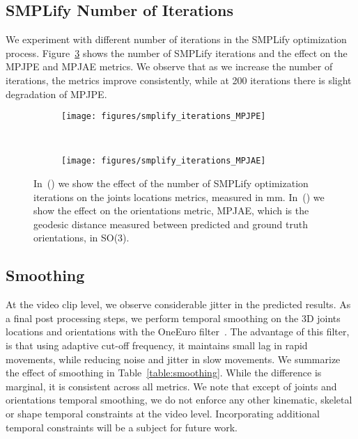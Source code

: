 \documentclass[runningheads]{llncs}
\begin{document}
\subsection{SMPLify Number of Iterations}

We experiment with different number of iterations in the SMPLify optimization process. Figure~\ref{fig:smplify_iters} shows the number of SMPLify iterations and the effect on the MPJPE and MPJAE metrics. We observe that as we increase the number of iterations, the metrics improve consistently, while at 200 iterations there is slight degradation of MPJPE.

\begin{figure}[h!]
	
	\begin{subfigure}[t]{0.5\textwidth}
		\texttt{[image: figures/smplify\_iterations\_MPJPE]}
		\centering
\caption{}
		\label{fig:smplify_iters_MPJPE}
	\end{subfigure}
	~
	\begin{subfigure}[t]{0.5\textwidth}
		\texttt{[image: figures/smplify\_iterations\_MPJAE]}
		\centering
\caption{}
		\label{fig:smplify_iters_MPJAE}
	\end{subfigure}
	\caption{In~() we show the effect of the number of SMPLify optimization iterations on the joints locations metrics, measured in mm. In~() we show the effect on the orientations metric, MPJAE, which is the geodesic distance measured between predicted and ground truth orientations, in SO(3).}
	\label{fig:smplify_iters}
\end{figure}

\subsection{Smoothing}

At the video clip level, we observe considerable jitter in the predicted results. As a final post processing steps, we perform temporal smoothing on the 3D joints locations and orientations with the OneEuro filter~\cite{casiez20121}. The advantage of this filter, is that using adaptive cut-off frequency, it maintains small lag in rapid movements, while reducing noise and jitter in slow movements. We summarize the effect of smoothing in Table~\ref{table:smoothing}. While the difference is marginal, it is consistent across all metrics. We note that except of joints and orientations temporal smoothing, we do not enforce any other kinematic, skeletal or shape temporal constraints at the video level. Incorporating additional temporal constraints will be a subject for future work.
\end{document}
